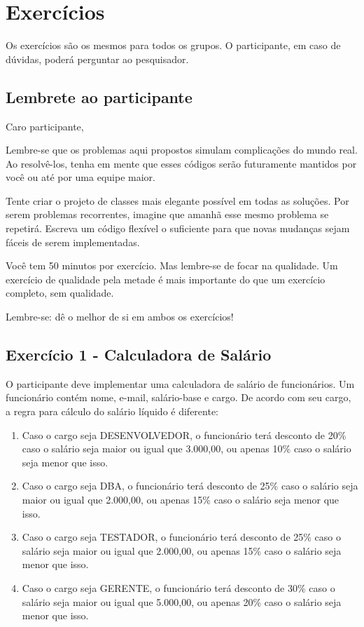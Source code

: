 \chapter{Exercícios}
\label{ape:exercicios}

Os exercícios são os mesmos para todos os grupos. O participante, em caso de dúvidas, poderá perguntar ao pesquisador.

\section{Lembrete ao participante}

Caro participante,

Lembre-se que os problemas aqui propostos simulam complicações do mundo real. 
Ao resolvê-los, tenha em mente que esses códigos serão futuramente mantidos
por você ou até por uma equipe maior.

Tente criar o projeto de classes mais elegante possível em todas as soluções. Por serem problemas
recorrentes, imagine que amanhã esse mesmo problema se repetirá.
Escreva um código flexível o suficiente para que novas mudanças sejam fáceis de serem 
implementadas.

Você tem 50 minutos por exercício. Mas lembre-se de focar na qualidade. Um exercício de 
qualidade pela metade é mais importante do que um exercício completo, sem qualidade.

Lembre-se: dê o melhor de si em ambos os exercícios!

\section{Exercício 1 - Calculadora de Salário}

O participante deve implementar uma calculadora de salário de funcionários. Um
funcionário contém nome, e-mail, salário-base e cargo. De acordo com seu cargo,
a regra para cálculo do salário líquido é diferente:

\begin{enumerate}
	\item Caso o cargo seja DESENVOLVEDOR, o funcionário terá desconto de 20\%
	caso o salário seja maior ou igual que 3.000,00, ou apenas 10\% caso o salário seja menor 
	que isso.
	
	\item Caso o cargo seja DBA, o funcionário terá desconto de 25\%
	caso o salário seja maior ou igual que 2.000,00, ou apenas 15\% caso o salário seja menor 
	que isso.

	\item Caso o cargo seja TESTADOR, o funcionário terá desconto de 25\%
	caso o salário seja maior ou igual que 2.000,00, ou apenas 15\% caso o salário seja menor 
	que isso.
	
	\item Caso o cargo seja GERENTE, o funcionário terá desconto de 30\%
	caso o salário seja maior ou igual que 5.000,00, ou apenas 20\% caso o salário seja menor 
	que isso.
\end{enumerate}

